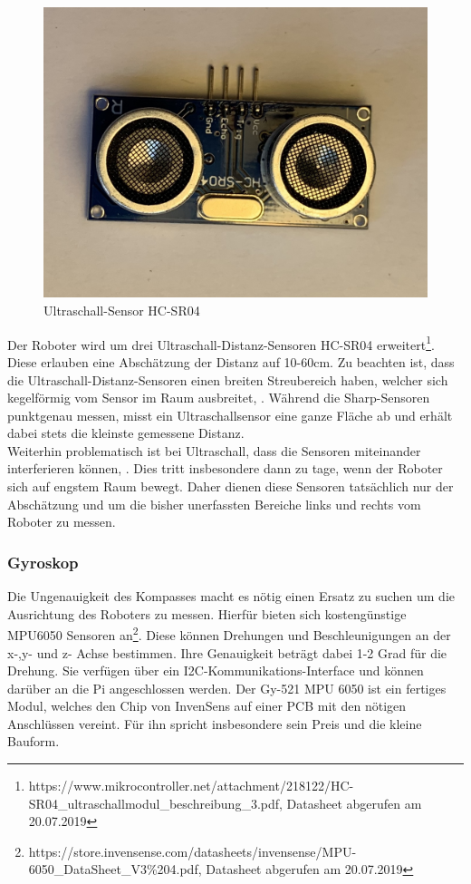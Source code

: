 \documentclass[twoside,11pt, a4paper]{report}
\begin{document}
	\begin{figure}[!htb]
		\centering
		\includegraphics[scale=0.1, angle=180]{images/ultraschall2.jpg}
		\caption{Ultraschall-Sensor HC-SR04}
	\end{figure}
	
	Der Roboter wird um drei Ultraschall-Distanz-Sensoren HC-SR04 erweitert\footnote{https://www.mikrocontroller.net/attachment/218122/HC-SR04\_ultraschallmodul\_beschreibung\_3.pdf, Datasheet abgerufen am 20.07.2019}. Diese erlauben eine Abschätzung der Distanz auf 10-60cm. Zu beachten ist, dass die Ultraschall-Distanz-Sensoren einen breiten Streubereich haben, welcher sich kegelförmig vom Sensor im Raum ausbreitet, \cite{Hering2012}. Während die Sharp-Sensoren punktgenau messen, misst ein Ultraschallsensor eine ganze Fläche ab und erhält dabei stets die kleinste gemessene Distanz.\\
	Weiterhin problematisch ist bei Ultraschall, dass die Sensoren miteinander interferieren können, \cite{HeLiNue2012}. Dies tritt insbesondere dann zu tage, wenn der Roboter sich auf engstem Raum bewegt. Daher dienen diese Sensoren tatsächlich nur der Abschätzung und um die bisher unerfassten Bereiche links und rechts vom Roboter zu messen. 
	
	\subsubsection{Gyroskop}
	Die Ungenauigkeit des Kompasses macht es nötig einen Ersatz zu suchen um die Ausrichtung des Roboters zu messen. Hierfür bieten sich kostengünstige MPU6050 Sensoren an\footnote{https://store.invensense.com/datasheets/invensense/MPU-6050\_DataSheet\_V3\%204.pdf, Datasheet abgerufen am 20.07.2019}. Diese können Drehungen und Beschleunigungen an der x-,y- und z- Achse bestimmen. Ihre Genauigkeit beträgt dabei 1-2 Grad für die Drehung. Sie verfügen über ein I2C-Kommunikations-Interface und können darüber an die Pi angeschlossen werden. Der Gy-521 MPU 6050 ist ein fertiges Modul, welches den Chip von InvenSens auf einer PCB mit den nötigen Anschlüssen vereint. Für ihn spricht insbesondere sein Preis und die kleine Bauform. 
	
\end{document}
